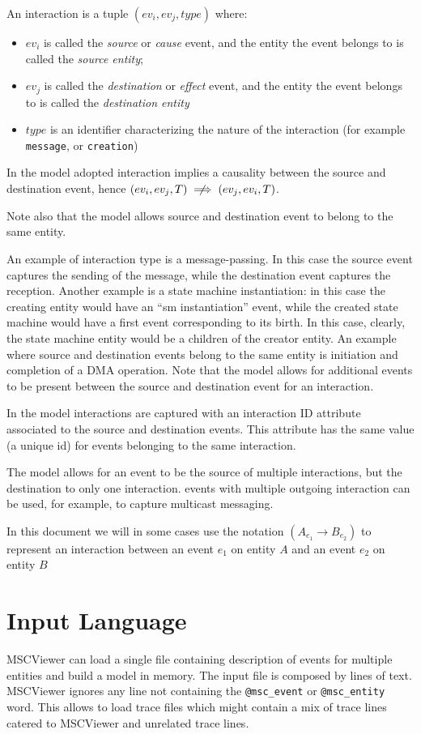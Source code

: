 \documentclass[11pt, twoside, titlepage]{book}
\newcommand{\prog}{MSCViewer}
\begin{document}
An interaction is a tuple $(ev_i, ev_j, type)$ where:
\begin{itemize}
  \item $ev_i$ is called the {\it source} or {\it cause} event, and the entity
  the event belongs to is called the {\it source entity};
  \item $ev_j$ is called the {\it destination} or {\it effect} event, and the
  entity the event belongs to is called the {\it destination entity}
  \item $type$ is an identifier characterizing the nature of the interaction
  (for example \texttt{message}, or \texttt{creation})
\end{itemize}
In the model adopted interaction implies a causality between the source and
destination event, hence $(ev_i, ev_j, T) \centernot\implies (ev_j, ev_i, T)$. 

Note also that the model allows source and destination event to belong to the
same entity.

An example of interaction type is a message-passing. In this case the source
event captures the sending of the message, while the destination event captures
the reception. Another example is a state machine instantiation:
in this case the creating entity would have an ``sm instantiation'' event, while
the created state machine would have a first event corresponding to its birth.
In this case, clearly, the state machine entity would be a children of the
creator entity. An example where source and destination events belong to the
same entity is initiation and completion of a DMA operation. 
Note that the model allows for additional events
to be present between the source and destination event for an interaction.

In the model interactions are captured with an interaction ID attribute
associated to the source and destination events. This attribute has the same
value (a unique id) for events belonging to the same  interaction.

The model allows for an event to be the source of multiple interactions, but
the destination to only one interaction. events with multiple outgoing
interaction can be used, for example, to capture multicast messaging.

In this document we will in some cases use the notation $(A_{e_1} \rightarrow
B_{e_2})$ to represent an interaction between an event $e_1$ on entity $A$ and
an event $e_2$ on entity $B$

\section{Input Language}
\prog{} can load a single file containing description of events for multiple
entities and build a model in memory. The input file is composed by lines of
text. \prog{} ignores any line not containing the \texttt{@msc\_event} or
\texttt{@msc\_entity} word. This allows to load trace files which might contain
a mix of trace lines catered to \prog{} and unrelated trace lines.
\end{document}
